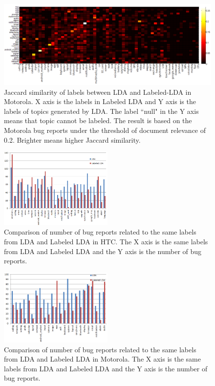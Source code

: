\documentclass[10pt, conference, compsocconf]{IEEEtran}
\begin{document}
\begin{figure}[htb]
\centering
\includegraphics[width=1\textwidth]{motosim.png}
\caption{Jaccard similarity of labels between LDA and Labeled-LDA in Motorola. X axis is the labels in Labeled LDA and Y axis is the labels of topics generated by LDA. The label ``null" in the Y axis means that topic cannot be labeled. The result is based on the Motorola bug reports under the threshold of document relevance of 0.2. Brighter means higher Jaccard similarity.}
\label{similaritymoto}
\end{figure}

\begin{figure}[htb]
\centering
\includegraphics[width=0.5\textwidth]{htcldallda.png}
\caption{Comparison of number of bug reports related to the same labels from LDA and Labeled LDA in HTC. The X axis is the same labels from LDA and Labeled LDA and the Y axis is the number of bug reports.}
\label{bughtc}
\end{figure}

\begin{figure}[!htb]
\centering
\includegraphics[width=0.5\textwidth]{motoldallda.png}
\caption{Comparison of number of bug reports related to the same labels from LDA and Labeled LDA in Motorola. The X axis is the same labels from LDA and Labeled LDA and the Y axis is the number of bug reports.}
\label{bugmoto}
\end{figure}
\end{document}
